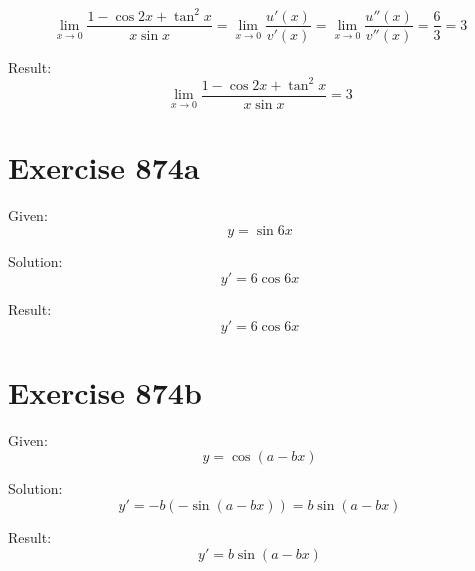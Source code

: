 \documentclass[a4paper, 10pt]{scrartcl}
\begin{document}
\[
\lim_{x\to 0}{\frac{1 - \cos{2x} + \tan^{2}{x}}{x\sin{x}}} = \lim_{x\to 0}{\frac{u'(x)}{v'(x)}} = \lim_{x\to 0}{\frac{u''(x)}{v''(x)}} =
\frac{6}{3} = 3
\]

Result:
\[
\lim_{x\to 0}{\frac{1 - \cos{2x} + \tan^{2}{x}}{x\sin{x}}} = 3
\]

\section{Exercise 874a}

Given:
\[
y = \sin{6x}
\]

Solution:
\[
y' = 6\cos{6x}
\]

Result:
\[
y' = 6\cos{6x}
\]

\section{Exercise 874b}

Given:
\[
y = \cos{(a - bx)}
\]

Solution:
\[
y' = -b(-\sin{(a - bx)}) = b\sin{(a - bx)}
\]

Result:
\[
y' = b\sin{(a - bx)}
\]
\end{document}

